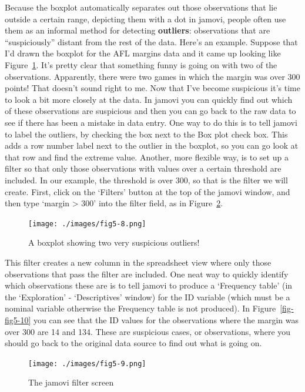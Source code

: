 \documentclass[
  letterpaper,
]{book}
\begin{document}
Because the boxplot automatically separates out those observations that
lie outside a certain range, depicting them with a dot in jamovi, people
often use them as an informal method for detecting \textbf{outliers}:
observations that are ``suspiciously'' distant from the rest of the
data. Here's an example. Suppose that I'd drawn the boxplot for the AFL
margins data and it came up looking like Figure~\ref{fig-fig5-8}. It's
pretty clear that something funny is going on with two of the
observations. Apparently, there were two games in which the margin was
over 300 points! That doesn't sound right to me. Now that I've become
suspicious it's time to look a bit more closely at the data. In jamovi
you can quickly find out which of these observations are suspicious and
then you can go back to the raw data to see if there has been a mistake
in data entry. One way to do this is to tell jamovi to label the
outliers, by checking the box next to the Box plot check box. This adds
a row number label next to the outlier in the boxplot, so you can go
look at that row and find the extreme value. Another, more flexible way,
is to set up a filter so that only those observations with values over a
certain threshold are included. In our example, the threshold is over
300, so that is the filter we will create. First, click on the `Filters'
button at the top of the jamovi window, and then type `margin
\textgreater{} 300' into the filter field, as in
Figure~\ref{fig-fig5-9}.

\begin{figure}

\texttt{[image: ./images/fig5-8.png]} \hfill{}

\caption{\label{fig-fig5-8}A boxplot showing two very suspicious
outliers!}

\end{figure}

This filter creates a new column in the spreadsheet view where only
those observations that pass the filter are included. One neat way to
quickly identify which observations these are is to tell jamovi to
produce a `Frequency table' (in the `Exploration' - `Descriptives'
window) for the ID variable (which must be a nominal variable otherwise
the Frequency table is not produced). In Figure~\ref{fig-fig5-10} you
can see that the ID values for the observations where the margin was
over 300 are 14 and 134. These are suspicious cases, or observations,
where you should go back to the original data source to find out what is
going on.

\begin{figure}

\texttt{[image: ./images/fig5-9.png]} \hfill{}

\caption{\label{fig-fig5-9}The jamovi filter screen}

\end{figure}
\end{document}
